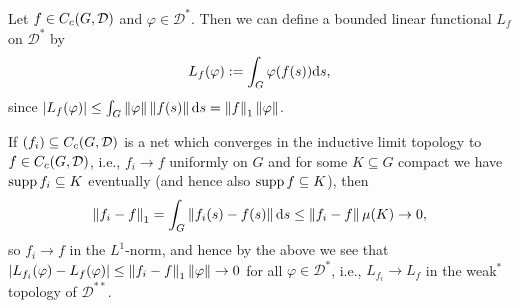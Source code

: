 \begin{definition}
Let $f \in C_c(G,\mathcal{D})$ and $\varphi \in \mathcal{D}^*$. Then we can define a bounded linear functional $L_f$ on $\mathcal{D}^*$ by
\begin{align*}
	L_f(\varphi) := \int_G \varphi(f(s)) \mathrm{d} s,
\end{align*}
since $| L_f(\varphi)| \leq \int_G \left\lVert \varphi \right\rVert \left\lVert f(s) \right\rVert \mathrm{d} s = \left\lVert f \right\rVert_1 \left\lVert \varphi\right\rVert$.
\end{definition}
\begin{note}	
If $(f_i) \subseteq  C_c(G,\mathcal{D})$ is a net which converges in the inductive limit topology to $f \in C_c(G,\mathcal{D})$, i.e., $f_i \to f$ uniformly on $G$ and for some $K \subseteq G$ compact we have $\operatorname{supp} f_i \subseteq K$ eventually (and hence also $\operatorname{supp} f \subseteq K$), then
\begin{align*}
\left\lVert f_i - f\right\rVert_1 = \int_{G} \left\lVert f_i(s) - f(s) \right\rVert \mathrm{d} s 	\leq \left\lVert f_i - f \right\rVert \mu(K) \to 0,
\end{align*}
so $f_i \to f$ in the $L^1$-norm, and hence by the above we see that $|L_{f_i}(\varphi) - L_f(\varphi) | \leq \left\lVert f_i-f\right\rVert_1 \left\lVert \varphi \right\rVert \to 0$ for all $ \varphi \in \mathcal{D}^*$, i.e.,  $L_{f_i}\to L_f$ in the weak$^*$ topology of $\mathcal{D}^{**}$.
\label{note:induct}
\end{note}

